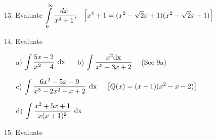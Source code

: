 \documentclass[12pt]{article}
\begin{document}
\begin{enumerate}
\item[13.] Evaluate $\displaystyle
							\int
							\limits_0^\infty
							\frac
								{dx}{x^4+1}; 
							\hspace*{2ex} 
								\displaystyle
								\left[
									x^4+1=
										(x^2-\sqrt{2}x+1)
										(x^2-\sqrt{2}x+1)
								\right]$
\item[14.] Evaluate
	\begin{enumerate}
	\item[a)] $\displaystyle
					\int
					\frac
						{5x-2}{x^2-4}\hspace*{1ex}
					\mathrm{dx} 			
					\hspace*{3ex}$ 
					b)
					 $\displaystyle
							 \int
							\frac
								{x^2\mathrm{dx}}{x^3-3x+2}															\hspace*{2ex} $
							(See 9a)\\
											
	\item[c)] $\displaystyle
					\int
					\frac
						{6x^2-5x-9}{x^3-2x^2-x+2}\hspace*{1ex}												\mathrm{dx} 
					\hspace*{3ex} 
					\left[
						Q(x)=(x-1)(x^2-x-2)
					\right]$\\
							
	\item[d)] $\displaystyle
					\int
					\frac
						{x^2+5x+1}{x(x+1)^2}
					\hspace*{1ex}					
					\mathrm{dx}$
	\end{enumerate}

\item[15.] Evaluate
\end{enumerate}
\end{document}
